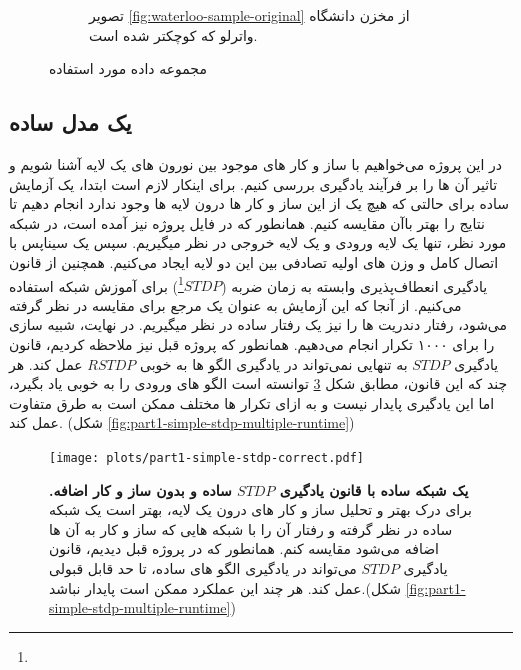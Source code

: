 \begin{figure}[!ht]
\begin{adjustbox}{minipage=\linewidth,scale=0.4}
\begin{subfigure}[b]{0.4\textwidth}
                    \caption{تصویر 
                    \ref{fig:waterloo-sample-original}
                    از مخزن دانشگاه واترلو که کوچکتر شده است.}
                    \label{fig:waterloo-sample-resized}
                \end{subfigure}
            \end{adjustbox}
            \caption{مجموعه داده مورد استفاده}
            \label{fig:dataset}
        \end{figure}
    \subsection{یک مدل ساده}
        در این پروژه می‌خواهیم با ساز و کار های موجود بین نورون های یک لایه آشنا شویم و تاثیر آن ها را بر فرآیند یادگیری بررسی کنیم. برای اینکار لازم است ابتدا، یک آزمایش ساده برای حالتی که هیچ یک از این ساز و کار ها درون لایه ها وجود ندارد انجام دهیم تا نتایج را بهتر با‌آن مقایسه کنیم. همانطور که در فایل پروژه نیز آمده است، در شبکه مورد نظر، تنها یک لایه ورودی و یک لایه خروجی در نظر میگیریم. سپس یک سیناپس با اتصال کامل و وزن های اولیه تصادفی بین این دو لایه ایجاد می‌کنیم. همچنین از قانون یادگیری انعطاف‌پذیری وابسته به زمان ضربه 
        ($STDP$\footnote{})
        برای آموزش شبکه استفاده می‌کنیم. از آنجا که این آزمایش به عنوان یک مرجع برای مقایسه در نظر گرفته می‌شود، رفتار دندریت ها را نیز یک رفتار ساده در نظر میگیریم. در نهایت، شبیه سازی را برای ۱۰۰۰ تکرار انجام می‌دهیم.
        همانطور که پروژه قبل نیز ملاحظه کردیم، قانون یادگیری 
        $STDP$ 
        به تنهایی نمی‌تواند در یادگیری الگو ها به خوبی 
        $RSTDP$ 
        عمل کند. هر چند که این قانون، مطابق شکل 
        \ref{fig:part1-simple-stdp-correct} 
        توانسته است الگو های ورودی را به خوبی یاد بگیرد، اما این یادگیری پایدار نیست و به ازای تکرار ها مختلف ممکن است به طرق متفاوت عمل کند.
        (شکل \ref{fig:part1-simple-stdp-multiple-runtime})
        \begin{figure}[!ht]
            \centering
            \texttt{[image: plots/part1-simple-stdp-correct.pdf]} 
            \captionsetup{width=.9\linewidth}
            \caption{\textbf{یک شبکه ساده با قانون یادگیری 
            $STDP$ ساده و بدون ساز و کار اضافه.} برای درک بهتر و تحلیل ساز و کار های درون یک لایه، بهتر است یک شبکه ساده در نظر گرفته و رفتار آن را با شبکه هایی که ساز و کار به آن ها اضافه می‌شود مقایسه کنم. همانطور که در پروژه قبل دیدیم، قانون یادگیری 
            $STDP$ 
            می‌تواند در یادگیری الگو های ساده، تا حد قابل قبولی عمل کند. هر چند این عملکرد ممکن است پایدار نباشد.(شکل \ref{fig:part1-simple-stdp-multiple-runtime})}
            \label{fig:part1-simple-stdp-correct}
        \end{figure}

